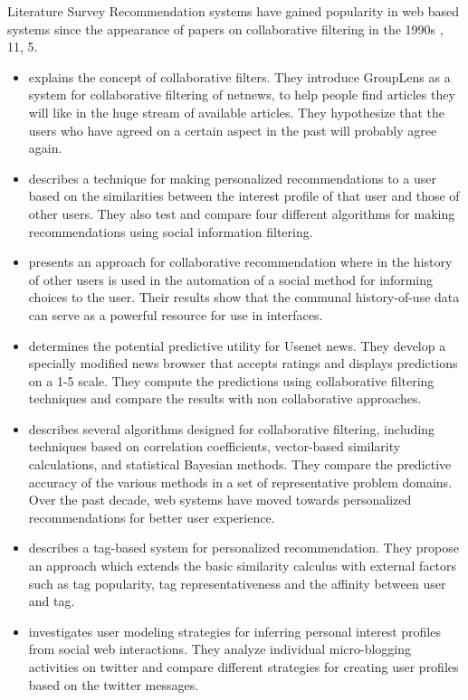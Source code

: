 \documentclass{report}
\begin{document}
\begin{projChapter}{Literature Survey}
        Recommendation systems have gained popularity in web based systems since the appearance of papers on collaborative filtering in the 1990s , 11, 5\rbrack.
        
\begin{itemize}
  \item  {}\rbrack explains the concept of collaborative filters. They introduce GroupLens as a system for collaborative filtering of netnews, to help people find articles they will like in the huge stream of available articles. They hypothesize that the users who have agreed on a certain aspect in the past will probably agree again.
  \item  {}\rbrack describes a technique for making personalized recommendations to a user based on the similarities between the interest profile of that user and those of other users. They also test and compare four different algorithms for making recommendations using social information filtering.
  \item  {}\rbrack presents an approach for collaborative recommendation where in the history of other users is used in the automation of a social method for informing choices to the user. Their results show that the communal history-of-use data can serve as a powerful resource for use in interfaces.
  \item  {}\rbrack determines the potential predictive utility for Usenet news. They develop a specially modified news browser that accepts ratings and displays predictions on a 1-5 scale. They compute the predictions using collaborative filtering techniques and compare the results with non collaborative approaches.
  \item  {}\rbrack describes several algorithms designed for collaborative filtering, including techniques based on correlation coefficients, vector-based similarity calculations, and statistical Bayesian methods. They compare the predictive accuracy of the various methods in a set of representative problem domains. Over the past decade, web systems have moved towards personalized recommendations for better user experience.
  \item  {}\rbrack describes a tag-based system for personalized recommendation. They propose an approach which extends the basic similarity calculus with external factors such as tag popularity, tag representativeness and the affinity between user and tag.
  \item  {}\rbrack investigates user modeling strategies for inferring personal interest profiles from social web interactions. They analyze individual micro-blogging activities on twitter and compare different strategies for creating user profiles based on the twitter messages.

\end{itemize}
\end{projChapter}
\end{document}
